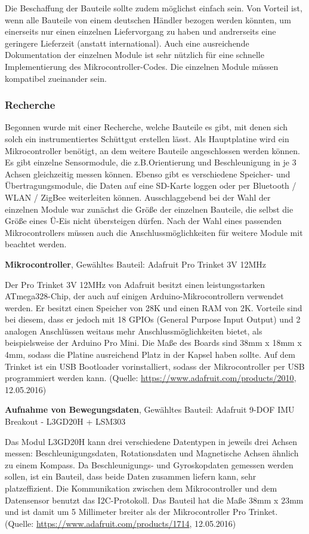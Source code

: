 {Die Beschaffung der Bauteile sollte zudem möglichst einfach sein. Von Vorteil ist, wenn alle Bauteile von einem deutschen Händler bezogen werden könnten, um einerseits nur einen einzelnen Liefervorgang zu haben und andrerseits eine geringere Lieferzeit (anstatt international). Auch eine ausreichende Dokumentation der einzelnen Module ist sehr nützlich für eine schnelle Implementierung des Mikrocontroller-Codes. Die einzelnen Module müssen kompatibel zueinander sein.

\subsubsection{Recherche}
Begonnen wurde mit einer Recherche, welche Bauteile es gibt, mit denen sich solch ein instrumentiertes Schüttgut erstellen lässt. Als Hauptplatine wird ein Mikrocontroller benötigt, an dem weitere Bauteile angeschlossen werden können. Es gibt einzelne Sensormodule, die z.B.Orientierung und Beschleunigung in je 3 Achsen gleichzeitig messen können. Ebenso gibt es verschiedene Speicher- und Übertragungsmodule, die Daten auf eine SD-Karte loggen oder per Bluetooth / WLAN / ZigBee weiterleiten können. Ausschlaggebend bei der Wahl der einzelnen Module war zunächst die Größe der einzelnen Bauteile, die selbst die Größe eines Ü-Eis nicht übersteigen dürfen. Nach der Wahl eines passenden Mikrocontrollers müssen auch die Anschlussmöglichkeiten für weitere Module mit beachtet werden.

\textbf{Mikrocontroller}, Gewähltes Bauteil: Adafruit Pro Trinket 3V 12MHz

Der Pro Trinket 3V 12MHz von Adafruit besitzt einen leistungsstarken ATmega328-Chip, der auch auf einigen Arduino-Mikrocontrollern verwendet werden. Er besitzt einen Speicher von 28K und einen RAM von 2K. Vorteile sind bei diesem, dass er jedoch mit 18 GPIOs (General Purpose Input Output) und 2 analogen Anschlüssen weitaus mehr Anschlussmöglichkeiten bietet, als beispielsweise der Arduino Pro Mini. Die Maße des Boards sind  38mm x 18mm x 4mm, sodass die Platine ausreichend Platz in der Kapsel haben sollte. Auf dem Trinket ist ein USB Bootloader vorinstalliert, sodass der Mikrocontroller per USB programmiert werden kann. (Quelle: \url{https://www.adafruit.com/products/2010}, 12.05.2016)

\textbf{Aufnahme von Bewegungsdaten}, Gewähltes Bauteil: Adafruit 9-DOF IMU Breakout - L3GD20H + LSM303

Das Modul L3GD20H kann drei verschiedene Datentypen in jeweils drei Achsen messen: Beschleunigungsdaten, Rotationsdaten und Magnetische Achsen ähnlich zu einem Kompass. Da Beschleunigungs- und Gyroskopdaten gemessen werden sollen, ist ein Bauteil, dass beide Daten zusammen liefern kann, sehr platzeffizient. Die Kommunikation zwischen dem Mikrocontroller und dem Datensensor benutzt das I2C-Protokoll. Das Bauteil hat die Maße 38mm x 23mm und ist damit um 5 Millimeter breiter als der Mikrocontroller Pro Trinket. (Quelle: \url{https://www.adafruit.com/products/1714}, 12.05.2016)

}
